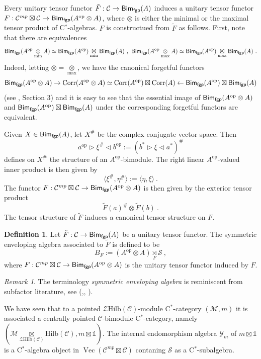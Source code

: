 \documentclass[a4paper,11pt,reqno]{amsart}
\numberwithin{equation}{section}
\theoremstyle{remark}
\newtheorem{remark}[theorem]{Remark}
\theoremstyle{definition}
\newtheorem{definition}[theorem]{Definition}
\newcommand{\cC}{\mathcal C}
\newcommand{\cM}{\mathcal M}
\newcommand{\cS}{\mathcal S}
\newcommand{\cY}{\mathcal Y}
\newcommand{\cZ}{\mathcal Z}
\newcommand{\fgpBim}{{\sf Bim_{fgp}}}
\DeclareMathOperator{\Vect}{Vec}
\DeclareMathOperator{\Corr}{Corr}
\newcommand\op{\text{op}}
\newcommand\un{{\mathds 1}}
\newcommand{\Hilb}{\mathrm{Hilb}}
\begin{document}
Every unitary tensor functor $\tilde{F}: \cC \to \fgpBim(A)$ induces a unitary tensor functor $F: \cC^{mp} \boxtimes \cC \to \fgpBim(A^{\op} \otimes A)$, where $\otimes$ is either the minimal or the maximal tensor product of C$^*$-algebras. $F$ is constructued from $\tilde{F}$ as follows. First, note that there are equivalences
\[
\fgpBim(A^{\op} \underset{\min}{\otimes} A) \simeq \fgpBim(A^{\op}) \underset{\min}{\boxtimes} \fgpBim(A) \  , \ \fgpBim(A^{\op} \underset{\max}{\otimes} A) \simeq \fgpBim(A^{\op}) \underset{\max}{\boxtimes} \fgpBim(A) \ .
\]
Indeed, letting $\otimes = \underset{\max}{\otimes}$, we have the canonical forgetful functors
\[
\fgpBim(A^{\op} \otimes A) \rightarrow \Corr(A^{\op} \otimes A) \simeq \Corr(A^{\op}) \boxtimes \Corr(A) \leftarrow \fgpBim(A^{\op}) \boxtimes \fgpBim(A)
\]
(see \cite{MR4162123}, Section 3) and it is easy to see that the essential image of $\fgpBim(A^{\op} \otimes A)$ and $\fgpBim(A^{\op}) \boxtimes \fgpBim(A)$ under the corresponding forgetful functors are equivalent. 

Given $X \in \fgpBim(A)$, let $X^\#$ be the complex conjugate vector space. Then
\[
a^{\op} \triangleright \xi^\# \triangleleft b^{\op} := (b^* \triangleright \xi \triangleleft a^*)^\#
\]
defines on $X^\#$ the structure of an $A^{\op}$-bimodule. The right linear $A^{\op}$-valued inner product is then given by
\[
\langle \xi^\# , \eta^\# \rangle := \langle \eta, \xi \rangle \ . 
\]
The functor $F: \cC^{mp} \boxtimes \cC \to \fgpBim(A^{\op} \otimes A)$ is then given by the exterior tensor product
\[
\tilde{F}(a)^\# \otimes \tilde{F}(b) \ .
\]
The tensor structure of $\tilde{F}$ induces a canonical tensor structure on $F$. 

\begin{definition}
	Let $\tilde{F}:\cC \to \fgpBim(A)$ be a unitary tensor functor. The symmetric enveloping algebra associated to $\tilde{F}$ is defined to be
	\[
	B_F:= (A^{\op} \otimes A) \underset{F}{\rtimes} \cS \ ,
	\]
	where $F: \cC^{mp} \boxtimes \cC \to \fgpBim(A^{\op} \otimes A)$ is the unitary tensor functor induced by $F$.
	\label{def:symmetricenvelopingalgebraofatensorfunctor}
\end{definition}


\begin{remark}
	The terminology {\em symmetric enveloping algebra} is reminiscent from subfactor literature, see (\cite{MR1302385},\cite{MR1742858}, \cite{MR1332979}).
\end{remark}

We have seen that to a pointed $\cZ \Hilb(\cC)$-module C$^*$-category $(\cM,m)$ it is associated a centrally pointed $\cC$-bimodule C$^*$-category, namely $(\cM \underset{\cZ \Hilb(\cC)}{\boxtimes} \Hilb(\cC), m \boxtimes \un)$. The internal endomorphism algebra $\cY_m$ of $m \boxtimes \un$ is a C$^*$-algebra object in $\Vect(\cC^{mp} \boxtimes \cC)$ contaning $\cS$ as a C$^*$-subalgebra. 
\end{document}
